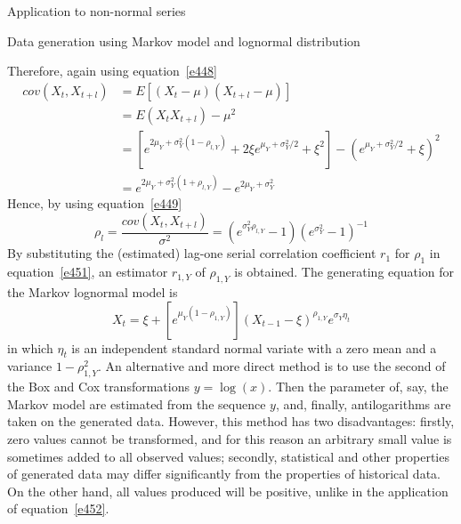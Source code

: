 \documentclass[8pt]{beamer}
\renewcommand{\emph}[1]{\textcolor{myorange}{#1}}
\begin{document}
\begin{frame}{Application to non-normal series}
    \begin{block}{Data generation using Markov model and lognormal distribution}
    \end{block}
    \vspace{-5pt}
    Therefore, again using equation~\ref{e448}
    \vspace{-5pt}
    \begin{align*}
        cov(X_t, X_{t+l}) &= E\left[(X_t - \mu)(X_{t+l}-\mu)\right]\\
                          &= E(X_t X_{t+l}) - \mu^2 \\
                          &=\left[ e^{2\mu_Y + \sigma_Y^2 (1-\rho_{l,Y})} + 2\xi e^{\mu_Y + \sigma_Y^2 /2} + \xi^2\right] - \left( e^{\mu_Y + \sigma_Y^2 /2} + \xi \right)^2 \\
                          &= e^{2\mu_Y + \sigma_Y^2 (1+ \rho_{l,Y})} - e^{2\mu_Y + \sigma_Y^2}
    \end{align*}
     Hence, by using equation~\ref{e449}
    \vspace{-5pt}
\begin{equation}
    \rho_l = \frac{cov(X_t, X_{t+l})}{\sigma^2} = \left(e^{\sigma_Y^2 \rho_{l,Y}}-1\right) \left(e^{\sigma_Y^2}-1\right)^{-1} 
        \label{e451}
    \end{equation}
    By substituting the (estimated) lag-one serial correlation coefficient $r_1$ for $\rho_1$ in equation~\ref{e451}, an estimator $r_{1,Y}$ of $\rho_{1,Y}$ is obtained. The generating equation for the \emph{Markov lognormal model} is 
    \vspace{-5pt}
\begin{equation}
    X_t = \xi + \left[e^{\mu_Y (1-\rho_{1,Y})}\right] (X_{t-1} -\xi)^{\rho_{1,Y}} e^{\sigma_Y \eta_t}
        \label{e452}
    \end{equation}
    in which $\eta_t$ is an independent standard normal variate with a zero \emph{mean} and a \emph{variance} $1-\rho_{1,Y}^2$.
    An alternative and more direct method is to use the second of the \emph{Box and Cox transformations} $y=\log(x)$. Then the parameter of, say, the \emph{Markov model} are estimated from the sequence $y$, and, finally, antilogarithms are taken on the generated data. However, this method has two disadvantages: firstly, \emph{zero values} cannot be transformed, and for this reason an arbitrary small value is sometimes added to all observed values; secondly, statistical and other properties of generated data may differ significantly from the properties of historical data. On the other hand, all values produced will be positive, unlike in the application of equation~\ref{e452}.
\end{frame}
\end{document}
